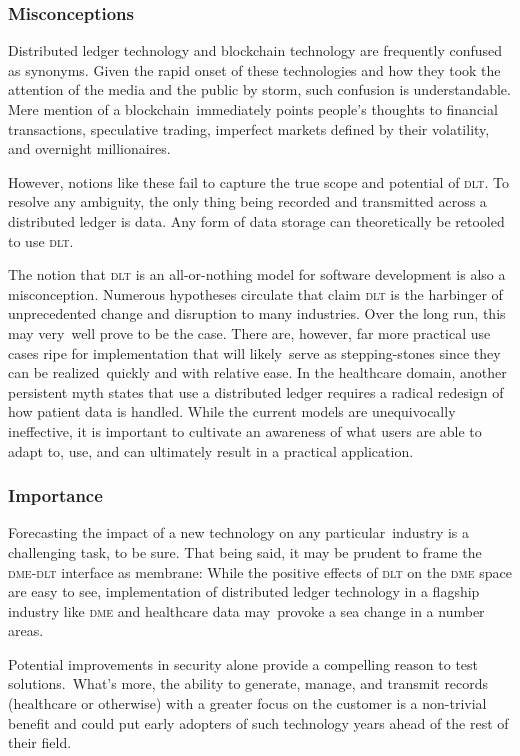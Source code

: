   \subsubsection{Misconceptions}
  Distributed ledger technology and blockchain technology are frequently confused as synonyms. Given the rapid onset of these technologies and how they took the attention of the media and the public by storm, such confusion is understandable. Mere mention of a blockchain immediately points people's thoughts to financial transactions, speculative trading, imperfect markets defined by their volatility, and overnight millionaires.%

  However, notions like these fail to capture the true scope and potential of \textsc{dlt}. To resolve any ambiguity, the only thing being recorded and transmitted across a distributed ledger is data. Any form of data storage can theoretically be retooled to use \textsc{dlt}.%

  The notion that \textsc{dlt} is an all-or-nothing model for software development is also a misconception. Numerous hypotheses circulate that claim \textsc{dlt} is the harbinger of unprecedented change and disruption to many industries. Over the long run, this may very well prove to be the case. There are, however, far more practical use cases ripe for implementation that will likely serve as stepping-stones since they can be realized quickly and with relative ease.%
%
  In the healthcare domain, another persistent myth states that use a distributed ledger requires a radical redesign of how patient data is handled. While the current models are unequivocally ineffective, it is important to cultivate an awareness of what users are able to adapt to, use, and can ultimately result in a practical application.%

  \subsubsection{Importance}
  Forecasting the impact of a new technology on any particular industry is a challenging task, to be sure. That being said, it may be prudent to frame the \textsc{dme}-\textsc{dlt} interface as membrane: While the positive effects of \textsc{dlt} on the \textsc{dme} space are easy to see, implementation of distributed ledger technology in a flagship industry like \textsc{dme} and healthcare data may provoke a sea change in a number areas.%

  Potential improvements in security alone provide a compelling reason to test solutions. What's more, the ability to generate, manage, and transmit records (healthcare or otherwise) with a greater focus on the customer is a non-trivial benefit and could put early adopters of such technology years ahead of the rest of their field.%

